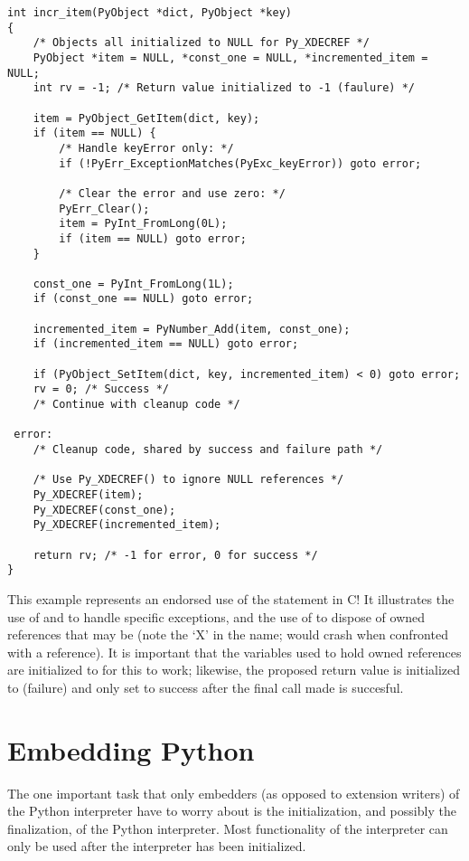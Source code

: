 \begin{verbatim}
int incr_item(PyObject *dict, PyObject *key)
{
    /* Objects all initialized to NULL for Py_XDECREF */
    PyObject *item = NULL, *const_one = NULL, *incremented_item = NULL;
    int rv = -1; /* Return value initialized to -1 (faulure) */

    item = PyObject_GetItem(dict, key);
    if (item == NULL) {
        /* Handle keyError only: */
        if (!PyErr_ExceptionMatches(PyExc_keyError)) goto error;

        /* Clear the error and use zero: */
        PyErr_Clear();
        item = PyInt_FromLong(0L);
        if (item == NULL) goto error;
    }

    const_one = PyInt_FromLong(1L);
    if (const_one == NULL) goto error;

    incremented_item = PyNumber_Add(item, const_one);
    if (incremented_item == NULL) goto error;

    if (PyObject_SetItem(dict, key, incremented_item) < 0) goto error;
    rv = 0; /* Success */
    /* Continue with cleanup code */

 error:
    /* Cleanup code, shared by success and failure path */

    /* Use Py_XDECREF() to ignore NULL references */
    Py_XDECREF(item);
    Py_XDECREF(const_one);
    Py_XDECREF(incremented_item);

    return rv; /* -1 for error, 0 for success */
}
\end{verbatim}

This example represents an endorsed use of the  statement 
in C!  It illustrates the use of  and 
 to handle specific exceptions, and the use of 
 to dispose of owned references that may be 
\NULL{} (note the `X' in the name;  would crash 
when confronted with a \NULL{} reference).  It is important that 
the variables used to hold owned references are initialized to 
\NULL{} for this to work; likewise, the proposed return value is 
initialized to  (failure) and only set to success after
the final call made is succesful.


\section{Embedding Python}

The one important task that only embedders (as opposed to extension
writers) of the Python interpreter have to worry about is the
initialization, and possibly the finalization, of the Python
interpreter.  Most functionality of the interpreter can only be used
after the interpreter has been initialized.

